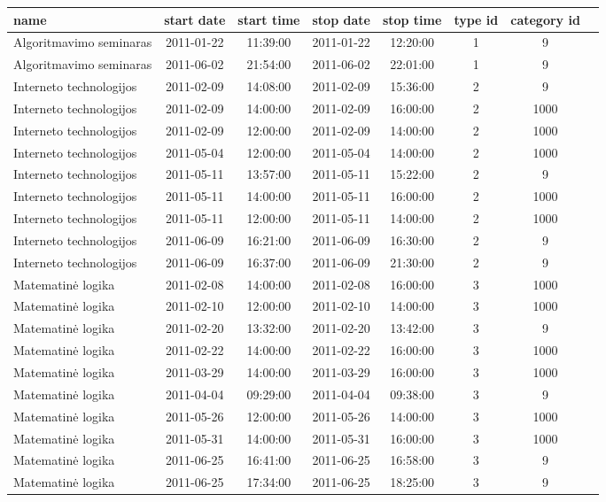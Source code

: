 \begin{sidewaystable}[ht!]
  \centering
  \begin{tabular}{|l|c|c|c|c|c|c|c|}
\hline
  { \bf name }              & { \bf start date} & { \bf start time} & { \bf stop date} 
  &  { \bf stop time} & { \bf type id} & { \bf category id}\\
\hline
Algoritmavimo seminaras&2011-01-22&11:39:00&2011-01-22&12:20:00&1&9\\
Algoritmavimo seminaras&2011-06-02&21:54:00&2011-06-02&22:01:00&1&9\\
Interneto technologijos&2011-02-09&14:08:00&2011-02-09&15:36:00&2&9\\
Interneto technologijos&2011-02-09&14:00:00&2011-02-09&16:00:00&2&1000\\
Interneto technologijos&2011-02-09&12:00:00&2011-02-09&14:00:00&2&1000\\
Interneto technologijos&2011-05-04&12:00:00&2011-05-04&14:00:00&2&1000\\
Interneto technologijos&2011-05-11&13:57:00&2011-05-11&15:22:00&2&9\\
Interneto technologijos&2011-05-11&14:00:00&2011-05-11&16:00:00&2&1000\\
Interneto technologijos&2011-05-11&12:00:00&2011-05-11&14:00:00&2&1000\\
Interneto technologijos&2011-06-09&16:21:00&2011-06-09&16:30:00&2&9\\
Interneto technologijos&2011-06-09&16:37:00&2011-06-09&21:30:00&2&9\\
Matematinė logika&2011-02-08&14:00:00&2011-02-08&16:00:00&3&1000\\
Matematinė logika&2011-02-10&12:00:00&2011-02-10&14:00:00&3&1000\\
Matematinė logika&2011-02-20&13:32:00&2011-02-20&13:42:00&3&9\\
Matematinė logika&2011-02-22&14:00:00&2011-02-22&16:00:00&3&1000\\
Matematinė logika&2011-03-29&14:00:00&2011-03-29&16:00:00&3&1000\\
Matematinė logika&2011-04-04&09:29:00&2011-04-04&09:38:00&3&9\\
Matematinė logika&2011-05-26&12:00:00&2011-05-26&14:00:00&3&1000\\
Matematinė logika&2011-05-31&14:00:00&2011-05-31&16:00:00&3&1000\\
Matematinė logika&2011-06-25&16:41:00&2011-06-25&16:58:00&3&9\\
Matematinė logika&2011-06-25&17:34:00&2011-06-25&18:25:00&3&9\\

\end{tabular}
\end{sidewaystable}
